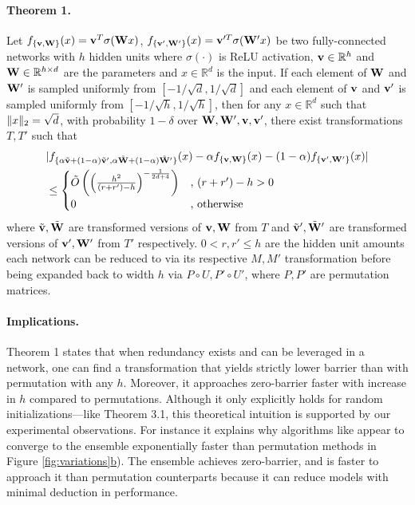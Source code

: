 \paragraph{Theorem 1.} 
Let $f_{\{{\mathbf{v}},{\mathbf{W}}\}}(x)={\mathbf{v}}^T\sigma({\mathbf{W}} x)$, $f_{\{{\mathbf{v'}},{\mathbf{W'}}\}}(x)={\mathbf{v}}'^T\sigma({\mathbf{W}}' x)$ be two fully-connected networks with $h$ hidden units where $\sigma(\cdot)$ is ReLU activation, ${\mathbf{v}}\in\mathbb{R}^h$ and ${\mathbf{W}}\in\mathbb{R}^{h\times d}$ are the parameters and $x\in\mathbb{R}^d$ is the input. If each element of ${\mathbf{W}}$ and ${\mathbf{W'}}$ is sampled uniformly from $[-1/\sqrt{d},1/\sqrt{d}]$ and each element of ${\mathbf{v}}$ and ${\mathbf{v'}}$ is sampled uniformly from $[-1/\sqrt{h},1/\sqrt{h}]$, then for any $x\in\mathbb{R}^d$ such that $\lVert x\rVert_2=\sqrt{d}$, with probability $1-\delta$ over ${\mathbf{W}},{\mathbf{W'}}, {\mathbf{v}}, {\mathbf{v'}}$, there exist transformations $T,T'$ such that
\begin{align}
    &|f_{\{\alpha\Tilde{{\mathbf{v}}} + (1-\alpha)\Tilde{{\mathbf{v}}}', \alpha\Tilde{{\mathbf{W}}}+(1-\alpha)\Tilde{{\mathbf{W}}}'\}}(x) - \alpha f_{\{{\mathbf{v}},{\mathbf{W}}\}}(x) - (1-\alpha)f_{\{{\mathbf{v}}',{\mathbf{W}}'\}}(x)| \nonumber \\
    &\leq\begin{cases}
            \Tilde{O}\left(\left(\frac{h^2}{(r+r')-h}\right)^{-\frac{1}{2d+4}}\right) & \text{, }(r+r')-h > 0 \\
            0 &\text{, otherwise}
        \end{cases}\label{eq:T_LMC}
\end{align}
where $\Tilde{{\mathbf{v}}},\Tilde{{\mathbf{W}}}$ are transformed versions of ${\mathbf{v}},{\mathbf{W}}$ from $T$ and $\Tilde{{\mathbf{v}}}',\Tilde{{\mathbf{W}}}'$ are transformed versions of ${\mathbf{v'}},{\mathbf{W'}}$ from $T'$ respectively. $0 < r, r' \leq h$ are the hidden unit amounts each network can be reduced to via its respective $M,M'$ transformation before being expanded back to width $h$ via $P\circ U,P'\circ U'$, where $P,P'$ are permutation matrices.

\paragraph{Implications.} Theorem 1 states that when redundancy exists and can be leveraged in a network, one can find a transformation that yields strictly lower barrier than with permutation with any $h$. Moreover, it approaches zero-barrier faster with increase in $h$ compared to permutations. Although it only explicitly holds for random initializations---like Theorem 3.1, this theoretical intuition is supported by our experimental observations. For instance it explains why algorithms like \name{} appear to converge to the ensemble exponentially faster than permutation methods in Figure \ref{fig:variations}\hyperref[fig:variations]{b}). The ensemble achieves zero-barrier, and \name{} is faster to approach it than permutation counterparts because it can reduce models with minimal deduction in performance. 



